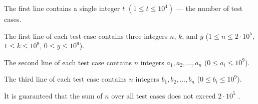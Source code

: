 The first line contains a single integer $t$ $(1 \le t \le 10^4)$ --- the number of test cases.

The first line of each test case contains three integers $n$, $k$, and $y$ ($1 \le n \le 2 \cdot 10^5$, $1 \le k \le 10^9$, $0 \le y \le 10^9$).

The second line of each test case contains $n$ integers $a_1, a_2, \dots, a_n$ ($0 \le a_i \le 10^9$).

The third line of each test case contains $n$ integers $b_1, b_2, \dots, b_n$ ($0 \le b_i \le 10^9$).

It is guaranteed that the sum of $n$ over all test cases does not exceed $2 \cdot 10^5$ .
